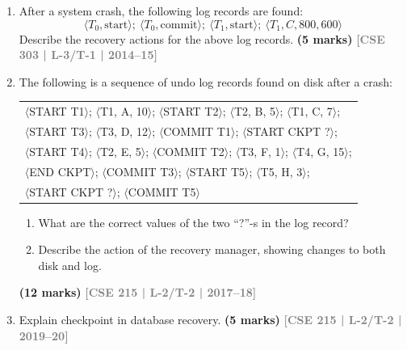 \documentclass[12pt,a3paper]{article}
\newcommand{\yr}[1]{\hfill\textcolor{gray}{\small\textbf{[#1]}}}
\newcommand{\mk}[1]{\textcolor{orange!70!black}{\small\textbf{(#1 marks)}}}
\begin{document}
\begin{enumerate}
\item After a system crash, the following log records are found:
\[\langle T_0,\text{start}\rangle;\ \langle T_0,\text{commit}\rangle;\ \langle T_1,\text{start}\rangle;\ \langle T_1,C,800,600\rangle\]
Describe the recovery actions for the above log records.
\mk{5} \yr{CSE 303 | L-3/T-1 | 2014--15}

\item The following is a sequence of undo log records found on disk after a crash:
\begin{center}
\small\ttfamily
\begin{tabular}{l}
$\langle$START T1$\rangle$; $\langle$T1, A, 10$\rangle$; $\langle$START T2$\rangle$; $\langle$T2, B, 5$\rangle$; $\langle$T1, C, 7$\rangle$;\\
$\langle$START T3$\rangle$; $\langle$T3, D, 12$\rangle$; $\langle$COMMIT T1$\rangle$; $\langle$START CKPT ?\thinspace$\rangle$;\\
$\langle$START T4$\rangle$; $\langle$T2, E, 5$\rangle$; $\langle$COMMIT T2$\rangle$; $\langle$T3, F, 1$\rangle$; $\langle$T4, G, 15$\rangle$;\\
$\langle$END CKPT$\rangle$; $\langle$COMMIT T3$\rangle$; $\langle$START T5$\rangle$; $\langle$T5, H, 3$\rangle$;\\
$\langle$START CKPT ?\thinspace$\rangle$; $\langle$COMMIT T5$\rangle$
\end{tabular}
\end{center}
\begin{enumerate}
  \item What are the correct values of the two ``?''-s in the log record?
  \item Describe the action of the recovery manager, showing changes to both disk and log.
\end{enumerate}
\mk{12} \yr{CSE 215 | L-2/T-2 | 2017--18}

\item Explain checkpoint in database recovery.
\mk{5} \yr{CSE 215 | L-2/T-2 | 2019--20}


\end{enumerate}
\end{document}

